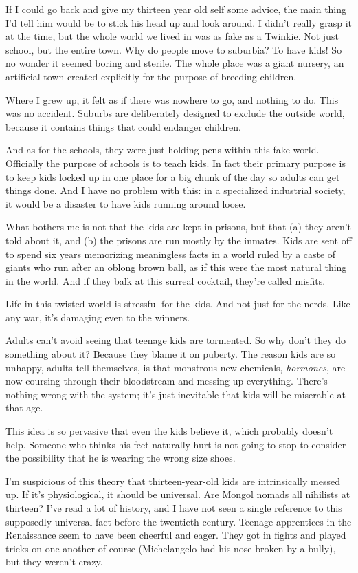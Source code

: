 If I could go back and give my thirteen year old self some advice, the
main thing I'd tell him would be to stick his head up and look around. I
didn't really grasp it at the time, but the whole world we lived in was
as fake as a Twinkie. Not just school, but the entire town. Why do
people move to suburbia? To have kids! So no wonder it seemed boring and
sterile. The whole place was a giant nursery, an artificial town created
explicitly for the purpose of breeding children.

Where I grew up, it felt as if there was nowhere to go, and nothing to
do. This was no accident. Suburbs are deliberately designed to exclude
the outside world, because it contains things that could endanger
children.

And as for the schools, they were just holding pens within this fake
world. Officially the purpose of schools is to teach kids. In fact their
primary purpose is to keep kids locked up in one place for a big chunk
of the day so adults can get things done. And I have no problem with
this: in a specialized industrial society, it would be a disaster to
have kids running around loose.

What bothers me is not that the kids are kept in prisons, but that (a)
they aren't told about it, and (b) the prisons are run mostly by the
inmates. Kids are sent off to spend six years memorizing meaningless
facts in a world ruled by a caste of giants who run after an oblong
brown ball, as if this were the most natural thing in the world. And if
they balk at this surreal cocktail, they're called misfits.

Life in this twisted world is stressful for the kids. And not just for
the nerds. Like any war, it's damaging even to the winners.

Adults can't avoid seeing that teenage kids are tormented. So why don't
they do something about it? Because they blame it on puberty. The reason
kids are so unhappy, adults tell themselves, is that monstrous new
chemicals, \emph{hormones}, are now coursing through their bloodstream
and messing up everything. There's nothing wrong with the system; it's
just inevitable that kids will be miserable at that age.

This idea is so pervasive that even the kids believe it, which probably
doesn't help. Someone who thinks his feet naturally hurt is not going to
stop to consider the possibility that he is wearing the wrong size
shoes.

I'm suspicious of this theory that thirteen-year-old kids are
intrinsically messed up. If it's physiological, it should be universal.
Are Mongol nomads all nihilists at thirteen? I've read a lot of history,
and I have not seen a single reference to this supposedly universal fact
before the twentieth century. Teenage apprentices in the Renaissance
seem to have been cheerful and eager. They got in fights and played
tricks on one another of course (Michelangelo had his nose broken by a
bully), but they weren't crazy.

